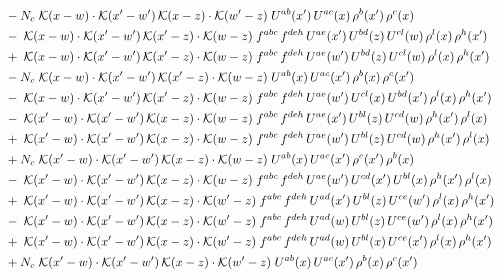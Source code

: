 \documentclass[9pt]{article}
\begin{document}
\begin{align}
&\quad -N_c\;\mathcal{K}(x-w)\cdot\mathcal{K}(x'-w')\,\mathcal{K}(x-z)\cdot\mathcal{K}(w'-z)\;U^{ab}(x')\,U^{ac}(x)\,\rho^{b}(x')\,\rho^{c}(x)\notag\\
&\quad -\;\mathcal{K}(x-w)\cdot\mathcal{K}(x'-w')\,\mathcal{K}(x'-z)\cdot\mathcal{K}(w-z)\;f^{abc}\,f^{deh}\,U^{ae}(x')\,U^{bd}(z)\,U^{cl}(w)\,\rho^{l}(x)\,\rho^{h}(x')\notag\\
&\quad +\;\mathcal{K}(x-w)\cdot\mathcal{K}(x'-w')\,\mathcal{K}(x'-z)\cdot\mathcal{K}(w-z)\;f^{abc}\,f^{deh}\,U^{ae}(w')\,U^{bd}(z)\,U^{cl}(w)\,\rho^{l}(x)\,\rho^{h}(x')\notag\\
&\quad -N_c\;\mathcal{K}(x-w)\cdot\mathcal{K}(x'-w')\,\mathcal{K}(x'-z)\cdot\mathcal{K}(w-z)\;U^{ab}(x)\,U^{ac}(x')\,\rho^{b}(x)\,\rho^{c}(x')\notag\\
&\quad -\;\mathcal{K}(x-w)\cdot\mathcal{K}(x'-w')\,\mathcal{K}(x'-z)\cdot\mathcal{K}(w-z)\;f^{abc}\,f^{deh}\,U^{ae}(w')\,U^{cl}(x)\,U^{bd}(x')\,\rho^{l}(x)\,\rho^{h}(x')\notag\\
&\quad -\;\mathcal{K}(x'-w)\cdot\mathcal{K}(x'-w')\,\mathcal{K}(x-z)\cdot\mathcal{K}(w-z)\;f^{abc}\,f^{deh}\,U^{ae}(x')\,U^{bl}(z)\,U^{cd}(w)\,\rho^{h}(x')\,\rho^{l}(x)\notag\\
&\quad +\;\mathcal{K}(x'-w)\cdot\mathcal{K}(x'-w')\,\mathcal{K}(x-z)\cdot\mathcal{K}(w-z)\;f^{abc}\,f^{deh}\,U^{ae}(w')\,U^{bl}(z)\,U^{cd}(w)\,\rho^{h}(x')\,\rho^{l}(x)\notag\\
&\quad +N_c\;\mathcal{K}(x'-w)\cdot\mathcal{K}(x'-w')\,\mathcal{K}(x-z)\cdot\mathcal{K}(w-z)\;U^{ab}(x)\,U^{ac}(x')\,\rho^{c}(x')\,\rho^{b}(x)\notag\\
&\quad -\;\mathcal{K}(x'-w)\cdot\mathcal{K}(x'-w')\,\mathcal{K}(x-z)\cdot\mathcal{K}(w-z)\;f^{abc}\,f^{deh}\,U^{ae}(w')\,U^{cd}(x')\,U^{bl}(x)\,\rho^{h}(x')\,\rho^{l}(x)\notag\\
&\quad +\;\mathcal{K}(x'-w)\cdot\mathcal{K}(x'-w')\,\mathcal{K}(x-z)\cdot\mathcal{K}(w'-z)\;f^{abc}\,f^{deh}\,U^{ad}(x')\,U^{bl}(z)\,U^{ce}(w')\,\rho^{l}(x)\,\rho^{h}(x')\notag\\
&\quad -\;\mathcal{K}(x'-w)\cdot\mathcal{K}(x'-w')\,\mathcal{K}(x-z)\cdot\mathcal{K}(w'-z)\;f^{abc}\,f^{deh}\,U^{ad}(w)\,U^{bl}(z)\,U^{ce}(w')\,\rho^{l}(x)\,\rho^{h}(x')\notag\\
&\quad +\;\mathcal{K}(x'-w)\cdot\mathcal{K}(x'-w')\,\mathcal{K}(x-z)\cdot\mathcal{K}(w'-z)\;f^{abc}\,f^{deh}\,U^{ad}(w)\,U^{bl}(x)\,U^{ce}(x')\,\rho^{l}(x)\,\rho^{h}(x')\notag\\
&\quad +N_c\;\mathcal{K}(x'-w)\cdot\mathcal{K}(x'-w')\,\mathcal{K}(x-z)\cdot\mathcal{K}(w'-z)\;U^{ab}(x)\,U^{ac}(x')\,\rho^{b}(x)\,\rho^{c}(x')\notag\\

\end{align}
\end{document}
